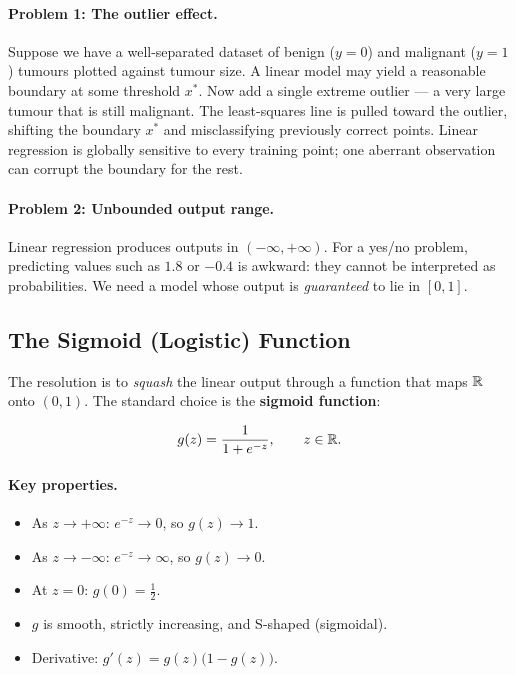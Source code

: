\paragraph{Problem 1: The outlier effect.}
Suppose we have a well-separated dataset of benign ($y=0$) and malignant
($y=1$) tumours plotted against tumour size. A linear model may yield a
reasonable boundary at some threshold $x^*$. Now add a single extreme outlier
— a very large tumour that is still malignant. The least-squares line is
pulled toward the outlier, shifting the boundary $x^*$ and misclassifying
previously correct points. Linear regression is globally sensitive to every
training point; one aberrant observation can corrupt the boundary for the rest.

\paragraph{Problem 2: Unbounded output range.}
Linear regression produces outputs in $(-\infty,+\infty)$. For a yes/no
problem, predicting values such as $1.8$ or $-0.4$ is awkward: they cannot be
interpreted as probabilities. We need a model whose output is
\emph{guaranteed} to lie in $[0,1]$.

\subsection{The Sigmoid (Logistic) Function}

The resolution is to \emph{squash} the linear output through a function that
maps $\mathbb{R}$ onto $(0,1)$. The standard choice is the \textbf{sigmoid function}:

\begin{definition}
\[
g(z)=\frac{1}{1+e^{-z}},\qquad z\in\mathbb{R}.
\]
\end{definition}

\paragraph{Key properties.}
\begin{itemize}
\item As $z\to+\infty$: $e^{-z}\to 0$, so $g(z)\to 1$.
\item As $z\to-\infty$: $e^{-z}\to\infty$, so $g(z)\to 0$.
\item At $z=0$: $g(0)=\tfrac{1}{2}$.
\item $g$ is smooth, strictly increasing, and S-shaped (sigmoidal).
\item Derivative: $g'(z)=g(z)\bigl(1-g(z)\bigr)$.
\end{itemize}

